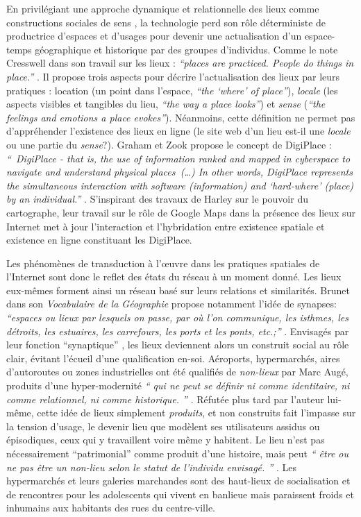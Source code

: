 En privilégiant une approche dynamique et relationnelle des lieux comme constructions sociales de sens \citep{Kyle2007}, la technologie perd son rôle déterministe de productrice d’espaces et d’usages pour devenir une actualisation d’un espace-temps géographique et historique par des groupes d’individus. Comme le note Cresswell dans son travail sur les lieux : \textit{“places are practiced. People do things in place.”} \citep{Cresswell2004}. Il propose trois aspects pour décrire l’actualisation des lieux par leurs pratiques : location (un point dans l’espace, \textit{“the ‘where’ of place”}), \textit{locale} (les aspects visibles et tangibles du lieu, \textit{“the way a place looks”}) et \textit{sense} (\textit{“the feelings and emotions a place evokes”}). Néanmoins, cette définition ne permet pas d’appréhender l’existence des lieux en ligne (le site web d’un lieu est-il une \textit{locale} ou une partie du \textit{sense}?). Graham et Zook propose le concept de DigiPlace : \textit{`` DigiPlace - that is, the use of information ranked and mapped in cyberspace to navigate and understand physical places (…) In other words, DigiPlace represents the simultaneous interaction with software (information) and `hard-where' (place) by an individual.''} \citep{Zook2007}. S’inspirant des travaux de Harley sur le pouvoir du cartographe, leur travail sur le rôle de Google Maps dans la présence des lieux sur Internet met à jour l’interaction et l’hybridation entre existence spatiale et existence en ligne constituant les DigiPlace. 

Les phénomènes de transduction à l’œuvre dans les pratiques spatiales de l’Internet sont donc le reflet des états du réseau à un moment donné. Les lieux eux-mêmes forment ainsi un réseau basé sur leurs relations et similarités. Brunet dans son \textit{Vocabulaire de la Géographie} propose notamment l’idée de synapses: \textit{``espaces ou lieux par lesquels on passe, par où l'on communique, les isthmes, les détroits, les estuaires, les carrefours, les ports et les ponts, etc.;''} \citep{Brunet1972}. Envisagés par leur fonction ``synaptique'' , les lieux deviennent alors un construit social au rôle clair, évitant l’écueil d’une qualification en-soi. Aéroports, hypermarchés, aires d’autoroutes ou zones industrielles ont été qualifiés de \textit{non-lieux} par Marc Augé, produits d’une  hyper-modernité \textit{`` qui ne peut se définir ni comme identitaire, ni comme relationnel, ni comme historique. ''} \citep{Auge1995}. Réfutée plus tard par l’auteur lui-même, cette idée de lieux simplement \textit{produits}, et non construits fait l’impasse sur la tension d’usage, le devenir lieu que modèlent ses utilisateurs assidus ou épisodiques, ceux qui y travaillent voire même y habitent. Le lieu n’est pas nécessairement “patrimonial” comme produit d’une histoire, mais peut \textit{`` être ou ne pas être un non-lieu selon le statut de l'individu envisagé. ''} \citep{Debarbieux1993}. Les hypermarchés et leurs galeries marchandes sont des haut-lieux de socialisation et de rencontres pour les adolescents qui vivent en banlieue \citep{Matthews2000} mais paraissent froids et inhumains aux habitants des rues du centre-ville.


